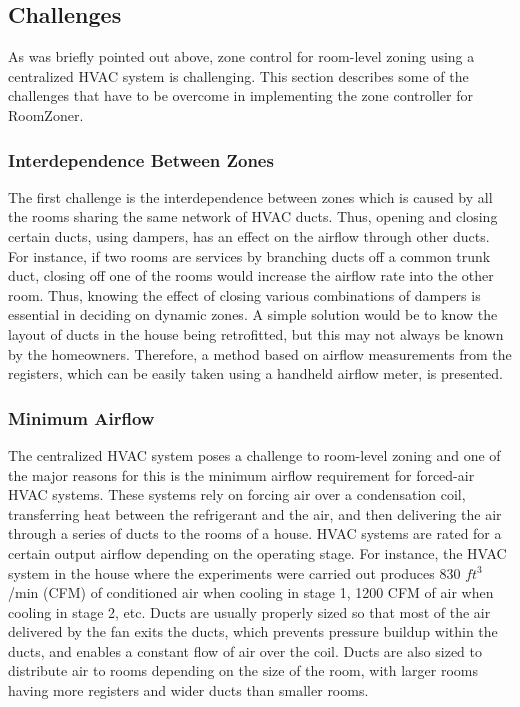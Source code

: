 \subsection{Challenges}
As was briefly pointed out above, zone control for room-level zoning using a
centralized HVAC system is challenging. This section describes some of the
challenges that have to be overcome in implementing the zone controller for
RoomZoner.


\subsubsection{Interdependence Between Zones}

The first challenge is the interdependence between zones which is caused by all
the rooms sharing the same network of HVAC ducts. Thus, opening and closing
certain ducts, using dampers, has an effect on the airflow through other
ducts. For instance, if two rooms are services by branching ducts off a common
trunk duct, closing off one of the rooms would increase the airflow rate into
the other room. Thus, knowing the effect of closing various combinations of
dampers is essential in deciding on dynamic zones. A simple solution would be to
know the layout of ducts in the house being retrofitted, but this may not always
be known by the homeowners. Therefore, a method based on airflow measurements
from the registers, which can be easily taken using a handheld airflow meter, is
presented.


\subsubsection{Minimum Airflow}
\label{sec:minAirflow}

The centralized HVAC system poses a challenge to room-level zoning and one of
the major reasons for this is the minimum airflow requirement for forced-air
HVAC systems. These systems rely on forcing air over a condensation coil,
transferring heat between the refrigerant and the air, and then delivering the
air through a series of ducts to the rooms of a house. HVAC systems are rated
for a certain output airflow depending on the operating stage. For instance, the
HVAC system in the house where the experiments were carried out produces 830
$ft^3$/min (CFM) of conditioned air when cooling in stage 1, 1200 CFM of air
when cooling in stage 2, etc. Ducts are usually properly sized so that most of
the air delivered by the fan exits the ducts, which prevents pressure buildup
within the ducts, and enables a constant flow of air over the coil. Ducts are
also sized to distribute air to rooms depending on the size of the room, with
larger rooms having more registers and wider ducts than smaller rooms.


